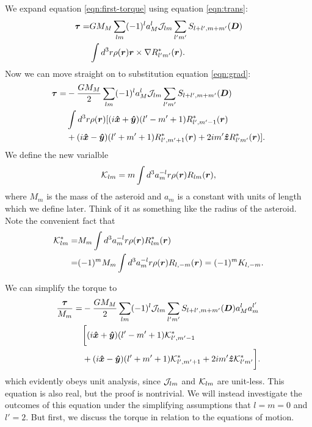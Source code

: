 \documentclass[aps,twocolumn,secnumarabic,balancelastpage,amsmath,amssymb,nofootinbib,floatfix]{revtex4-1}
\begin{document}
We expand equation \ref{eqn:first-torque} using equation \ref{eqn:trans}:
\begin{equation*}
\begin{aligned}
\bm \tau = &GM_M \sum_{lm}(-1)^l a_M^l \mathcal{J}_{lm}\sum_{l'm'}S_{l+l',m+m'}(\bm D) \\
&\int d^3 r \rho(\bm r) \bm r \times \nabla R^*_{l'm'}(\bm r).
\end{aligned}
\end{equation*}
Now we can move straight on to substitution equation \ref{eqn:grad}:
\begin{equation*}
\begin{aligned}
\bm \tau = &-\frac{GM_M}{2}\sum_{lm}(-1)^l a_M^l \mathcal{J}_{lm}\sum_{l'm'}S_{l+l',m+m'}(\bm D) \\
&\int d^3 r \rho(\bm r) [(i\bm{\hat x} + \bm{\hat y})(l'-m'+1)R^*_{l',m'-1}(\bm r)\\
&+(i\bm{\hat x}-\bm{\hat y})(l'+m'+1)R^*_{l',m'+1}(\bm r)+2im'\bm{\hat z} R^*_{l'm'}(\bm r)].
\end{aligned}
\end{equation*}
We define the new varialble
\begin{equation}
\mathcal{K}_{lm} = m\int d^3 a_m^{-l}r \rho(\bm r) R_{lm} (\bm r),
\label{eqn:klm-def}
\end{equation}
where $M_m$ is the mass of the asteroid and $a_m$ is a constant with units of length which we define later. Think of it as something like the radius of the asteroid. Note the convenient fact that
\begin{equation}
\begin{aligned}
\mathcal{K}_{lm}^* = &M_m\int d^3 a_m^{-l}r \rho(\bm r) R_{lm}^* (\bm r) \\
= &(-1)^mM_m\int d^3 a_m^{-l}r \rho(\bm r) R_{l,-m} (\bm r) = (-1)^mK_{l,-m}.\\
\label{eqn:klm-def}
\end{aligned}
\end{equation}

We can simplify the torque to
\begin{equation}
\begin{aligned}
\frac{\bm \tau}{M_m} = &-\frac{GM_M}{2}\sum_{lm}(-1)^l \mathcal{J}_{lm}\sum_{l'm'}S_{l+l',m+m'}(\bm D) a_M^l a_m^{l'}\\
&\bigg[(i\bm{\hat x} + \bm{\hat y})(l'-m'+1)\mathcal{K}^*_{l',m'-1}\\
&+(i\bm{\hat x}-\bm{\hat y})(l'+m'+1)\mathcal{K}^*_{l',m'+1}+2im'\bm{\hat z} \mathcal{K}^*_{l'm'}\bigg].
\label{eqn:complex-torque}
\end{aligned}
\end{equation}
which evidently obeys unit analysis, since $\mathcal{J}_{lm}$ and $\mathcal{K}_{lm}$ are unit-less. This equation is also real, but the proof is nontrivial. We will instead investigate the outcomes of this equation under the simplifying assumptions that $l=m=0$ and $l'=2$. But first, we discuss the torque in relation to the equations of motion.
\end{document}
